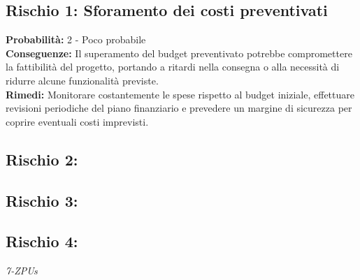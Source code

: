\documentclass[a4paper,12pt]{article}
\begin{document}
\subsection{Rischio 1: Sforamento dei costi preventivati}
\textbf{Probabilità:} 2 - Poco probabile\\
\textbf{Conseguenze:} Il superamento del budget preventivato potrebbe compromettere la fattibilità del progetto, portando a ritardi nella consegna o alla necessità di ridurre alcune funzionalità previste.\\
\textbf{Rimedi:} Monitorare costantemente le spese rispetto al budget iniziale, effettuare revisioni periodiche del piano finanziario e prevedere un margine di sicurezza per coprire eventuali costi imprevisti.

\subsection{Rischio 2:}

\subsection{Rischio 3:}

\subsection{Rischio 4:}



\vspace{0.5cm}


\vfill
\begin{flushright}
    \textit{7-ZPUs}
\end{flushright}
\end{document}
